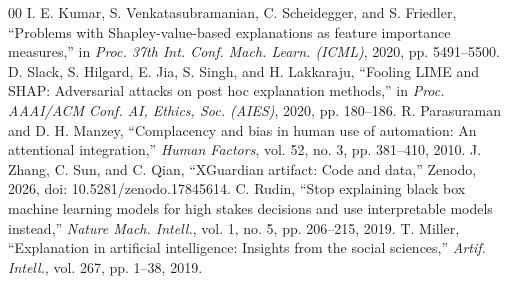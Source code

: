 \documentclass[conference]{IEEEtran}
\begin{document}
\begin{thebibliography}{00}
 I. E. Kumar, S. Venkatasubramanian, C. Scheidegger, and S. Friedler, ``Problems with Shapley-value-based explanations as feature importance measures,'' in \textit{Proc. 37th Int. Conf. Mach. Learn. (ICML)}, 2020, pp. 5491--5500.
 D. Slack, S. Hilgard, E. Jia, S. Singh, and H. Lakkaraju, ``Fooling LIME and SHAP: Adversarial attacks on post hoc explanation methods,'' in \textit{Proc. AAAI/ACM Conf. AI, Ethics, Soc. (AIES)}, 2020, pp. 180--186.
 R. Parasuraman and D. H. Manzey, ``Complacency and bias in human use of automation: An attentional integration,'' \textit{Human Factors}, vol. 52, no. 3, pp. 381--410, 2010.
 J. Zhang, C. Sun, and C. Qian, ``XGuardian artifact: Code and data,'' Zenodo, 2026, doi: 10.5281/zenodo.17845614.
 C. Rudin, ``Stop explaining black box machine learning models for high stakes decisions and use interpretable models instead,'' \textit{Nature Mach. Intell.}, vol. 1, no. 5, pp. 206--215, 2019.
 T. Miller, ``Explanation in artificial intelligence: Insights from the social sciences,'' \textit{Artif. Intell.}, vol. 267, pp. 1--38, 2019.
\end{thebibliography}
\end{document}
